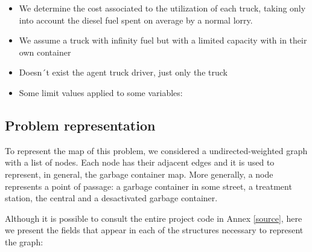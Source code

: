 \documentclass[a4paper]{article}
\begin{document}
\begin{itemize}
	\item We determine the cost associated to the utilization of each truck, taking only into account the diesel fuel spent on average by a normal lorry. 
	
	\item We assume a truck with infinity fuel but with a limited capacity with in their own container
	
	\item Doesn´t exist the agent truck driver, just only the truck
	
	\item Some limit values applied to some variables:
		
\end{itemize}

\subsection{Problem representation}

To represent the map of this problem, we considered a undirected-weighted graph with a list of nodes. Each node has their adjacent edges and it is used to represent, in general, the garbage container map. More generally, a node represents a point of passage: a garbage container in some street, a treatment station, the central and a desactivated garbage container. 

Although it is possible to consult the entire project code in Annex \ref{source}, here we present the fields that appear in each of the structures necessary to represent the graph:
\end{document}
